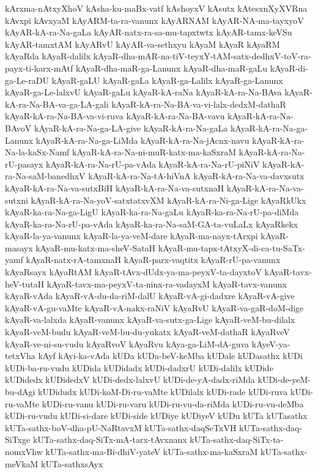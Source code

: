 {kArxma-nAtxyXhoV
kAsha-ku-maBx-vatf
kAshoyxV
kAsutx
kAtesxnXyXVRna
kAvxpi
kAvxyaM
kAyARM-ta-ra-vanunx
kAyARNAM
kAyAR-NA-ma-tayxyoV
kAyAR-kA-ra-Na-gaLa
kAyAR-natx-ra-sa-mu-tapxtwtx
kAyAR-tamx-keVSu
kAyAR-tamxtAM
kAyARvU
kAyAR-va-sethxyu
kAyaM
kAyaR
kAyaRM
kAyaRda
kAyaR-dalilx
kAyaR-dha-mAR-na-tiV-teyxY-tAM-satx-dedhxV-toV-ra-payx-ti-karx-mAtf
kAyaR-dha-maR-ga-Lanunx
kAyaR-dha-maR-gaLu
kAyaR-di-ga-Le-raDU
kAyaR-gaLU
kAyaR-gaLa
kAyaR-ga-Lalilx
kAyaR-ga-Lanunx
kAyaR-ga-Le-lalxvU
kAyaR-gaLu
kAyaR-kA-raNa
kAyaR-kA-ra-Na-BAva
kAyaR-kA-ra-Na-BA-va-ga-LA-gali
kAyaR-kA-ra-Na-BA-va-vi-lalx-dedxM-dathaR
kAyaR-kA-ra-Na-BA-va-vi-ruva
kAyaR-kA-ra-Na-BA-vavu
kAyaR-kA-ra-Na-BAvoV
kAyaR-kA-ra-Na-ga-LA-give
kAyaR-kA-ra-Na-gaLa
kAyaR-kA-ra-Na-ga-Lanunx
kAyaR-kA-ra-Na-ga-LiMda
kAyaR-kA-ra-Na-jAcnx-navu
kAyaR-kA-ra-Na-la-kaSx-Namf
kAyaR-kA-ra-Na-ni-muR-katx-ma-kaSxraM
kAyaR-kA-ra-Na-rU-pasayx
kAyaR-kA-ra-Na-rU-pa-vAda
kAyaR-kA-ra-Na-rU-piNiV
kAyaR-kA-ra-Na-saM-banedhxV
kAyaR-kA-ra-Na-tA-hiVnA
kAyaR-kA-ra-Na-va-davxsutx
kAyaR-kA-ra-Na-va-sutxBiH
kAyaR-kA-ra-Na-va-sutxnaH
kAyaR-kA-ra-Na-va-sutxni
kAyaR-kA-ra-Na-yoV-satxtatxvXM
kAyaR-kA-ra-Ni-ga-Lige
kAyaRkUkx
kAyaR-ka-ra-Na-ga-LigU
kAyaR-ka-ra-Na-gaLu
kAyaR-ka-ra-Na-rU-pa-diMda
kAyaR-ka-ra-Na-rU-pa-vAda
kAyaR-ka-ra-Na-saM-GA-ta-vuLaLx
kAyaRkekx
kAyaR-la-ya-vanunx
kAyaR-la-ya-veM-dare
kAyaR-ma-nayx-tArxpi
kAyaR-masayx
kAyaR-mu-katx-ma-sheV-SataH
kAyaR-mu-tapx-tAtxyX-di-ca-tu-SaTx-yamf
kAyaR-natx-rA-tamxnaH
kAyaR-parx-vaqtitx
kAyaR-rU-pa-vanunx
kAyaRsayx
kAyaRtAM
kAyaR-tAvx-dUdx-ya-ma-peyxV-ta-dayxtoV
kAyaR-tavx-heV-tutaH
kAyaR-tavx-ma-peyxV-ta-ninx-ra-vadayxM
kAyaR-tavx-vanunx
kAyaR-vAda
kAyaR-vA-du-da-riM-dalU
kAyaR-vA-gi-dadxre
kAyaR-vA-give
kAyaR-vA-gu-vaMte
kAyaR-vA-nakx-raNiV
kAyaRvU
kAyaR-va-gaR-doM-dige
kAyaR-va-lalxda
kAyaR-vanunx
kAyaR-va-sutx-ga-Lige
kAyaR-veM-bu-dilalx
kAyaR-veM-budu
kAyaR-veM-bu-du-yukatx
kAyaR-veM-dathaR
kAyaRveV
kAyaR-ve-ni-su-vudu
kAyaRvoV
kAyaRvu
kAya-ga-LiM-dA-guva
kAyeV-ya-tetxVha
kAyf
kAyi-ka-vAda
kUDa
kUDa-beV-keMba
kUDale
kUDasathx
kUDi
kUDi-ba-ru-vudu
kUDida
kUDidadx
kUDi-dadxrU
kUDi-dalilx
kUDide
kUDidedx
kUDidedxV
kUDi-dedx-lalxvU
kUDi-de-yA-dadx-riMda
kUDi-de-yeM-bu-dAgi
kUDidudx
kUDi-koM-Di-ru-vaMte
kUDilalx
kUDi-rade
kUDi-ruva
kUDi-ru-vaMte
kUDi-ru-vanu
kUDi-ru-varu
kUDi-ru-vu-da-riMda
kUDi-ru-vu-deMba
kUDi-ru-vudu
kUDi-si-dare
kUDi-side
kUDiye
kUDiyeV
kUDu
kUTa
kUTasathx
kUTa-sathx-boV-dha-pU-NaRtavxM
kUTa-sathx-daqSeTxVH
kUTa-sathx-daq-SiTxge
kUTa-sathx-daq-SiTx-mA-tarx-tAvxnanx
kUTa-sathx-daq-SiTx-ta-nomxVhw
kUTa-sathx-ma-Bi-dhiV-yateV
kUTa-sathx-ma-kaSxraM
kUTa-sathx-meVkaM
kUTa-sathxsAyx
}
